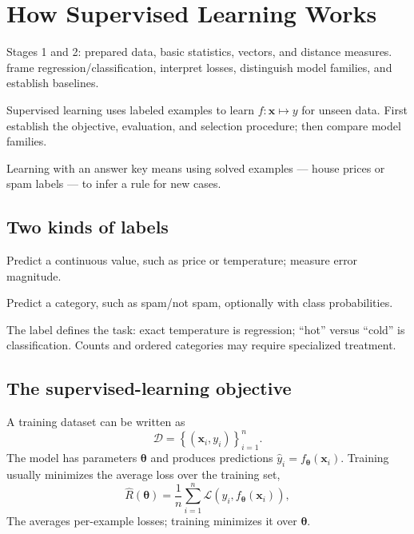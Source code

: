 \chapter{How Supervised Learning Works}
\label{ch:supervised}

\chapterguide%
  {Stages 1 and 2: prepared data, basic statistics, vectors, and distance measures.}
  {frame regression/classification, interpret losses, distinguish model families, and establish baselines.}

Supervised learning uses labeled examples to learn $f:\bm{x}\mapsto y$ for unseen data. First establish the objective, evaluation, and selection procedure; then compare model families.

\begin{intuition}
Learning with an answer key means using solved examples --- house prices or spam labels --- to infer a rule for new cases.
\end{intuition}

\section{Two kinds of labels}

\begin{description}[leftmargin=1.25in,style=nextline]
  \item[Regression] Predict a continuous value, such as price or temperature; measure error magnitude.
  \item[Classification] Predict a category, such as spam/not spam, optionally with class probabilities.
\end{description}

The label defines the task: exact temperature is regression; ``hot'' versus ``cold'' is classification. Counts and ordered categories may require specialized treatment.

\section{The supervised-learning objective}

A training dataset can be written as
\[
  \mathcal{D}={\left\{(\bm{x}_i,y_i)\right\}}_{i=1}^{n}.
\]
The model has parameters $\bm{\theta}$ and produces predictions $\hat{y}_i=f_{\bm{\theta}}(\bm{x}_i)$. Training usually minimizes the average loss over the training set,
\[
  \hat{R}(\bm{\theta})
  =\frac{1}{n}\sum_{i=1}^{n}
  \mathcal{L}\!\left(y_i,f_{\bm{\theta}}(\bm{x}_i)\right),
\]
The  averages per-example losses; training minimizes it over $\bm{\theta}$.

